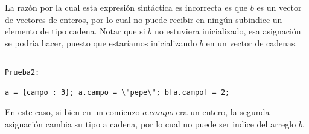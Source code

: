 La razón por la cual esta expresión sintáctica es incorrecta es que $b$ es un vector de vectores de enteros, por lo cual no puede recibir en ningún subindice un elemento de tipo cadena. Notar que si $b$ no estuviera inicializado, esa asignación se podría hacer, puesto que estaríamos inicializando $b$ en un vector de cadenas.

\begin{verbatim}

Prueba2:

a = {campo : 3}; a.campo = \"pepe\"; b[a.campo] = 2;

\end{verbatim}

En este caso, si bien en un comienzo $a.campo$ era un entero, la segunda asignación cambia su tipo a cadena, por lo cual no puede ser indice del arreglo $b$.